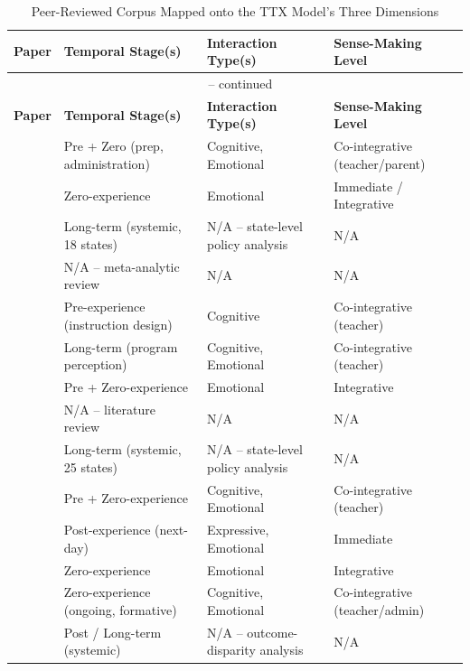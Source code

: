 \documentclass[11pt]{article}
\begin{document}
{\small
\begin{longtable}{p{2.6cm} p{4.3cm} p{4.3cm} p{3.3cm}}
\caption{Peer-Reviewed Corpus Mapped onto the TTX Model's Three Dimensions} \label{tab:mapping-openalex} \\
\toprule
\textbf{Paper} & \textbf{Temporal Stage(s)} & \textbf{Interaction Type(s)} & \textbf{Sense-Making Level} \\
\midrule
\endfirsthead
\multicolumn{4}{c}{\tablename\ \thetable{} -- continued} \\
\toprule
\textbf{Paper} & \textbf{Temporal Stage(s)} & \textbf{Interaction Type(s)} & \textbf{Sense-Making Level} \\
\midrule
\endhead
\bottomrule
\endfoot
\citet{barksdale2000stakes} & Pre + Zero (prep, administration) & Cognitive, Emotional & Co-integrative (teacher/parent) \\
\citet{segool2013anxiety} & Zero-experience & Emotional & Immediate / Integrative \\
\citet{amrein2002learning} & Long-term (systemic, 18 states) & N/A -- state-level policy analysis & N/A \\
\citet{sackett2008validity} & N/A -- meta-analytic review & N/A & N/A \\
\citet{zimmerman2008mastery} & Pre-experience (instruction design) & Cognitive & Co-integrative (teacher) \\
\citet{jones2004voices} & Long-term (program perception) & Cognitive, Emotional & Co-integrative (teacher) \\
\citet{banks2015ireland} & Pre + Zero-experience & Emotional & Integrative \\
\citet{polesel2012experience} & N/A -- literature review & N/A & N/A \\
\citet{nichols2006accountability} & Long-term (systemic, 25 states) & N/A -- state-level policy analysis & N/A \\
\citet{gordon1997price} & Pre + Zero-experience & Cognitive, Emotional & Co-integrative (teacher) \\
\citet{triplett2005perceptions} & Post-experience (next-day) & Expressive, Emotional & Immediate \\
\citet{vonderembse2012settings} & Zero-experience & Emotional & Integrative \\
\citet{yeh2006rapid} & Zero-experience (ongoing, formative) & Cognitive, Emotional & Co-integrative (teacher/admin) \\
\citet{horn2003cycle} & Post / Long-term (systemic) & N/A -- outcome-disparity analysis & N/A \\

\end{longtable}}
\end{document}
